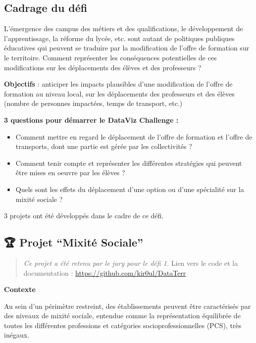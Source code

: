 \documentclass[]{book}
\begin{document}
\subsection{Cadrage du défi}\label{cadrage-du-defi}

L'émergence des campus des métiers et des qualifications, le
développement de l'apprentissage, la réforme du lycée, etc. sont autant
de politiques publiques éducatives qui peuvent se traduire par la
modification de l'offre de formation sur le territoire. Comment
représenter les conséquences potentielles de ces modifications sur les
déplacements des élèves et des professeurs ?

\textbf{Objectifs} : anticiper les impacts plausibles d'une modification
de l'offre de formation au niveau local, sur les déplacements des
professeurs et des élèves (nombre de personnes impactées, temps de
transport, etc.)

\textbf{3 questions pour démarrer le DataViz Challenge :}

\begin{itemize}
\item
  Comment mettre en regard le déplacement de l'offre de formation et
  l'offre de transports, dont une partie est gérée par les collectivités
  ?
\item
  Comment tenir compte et représenter les différentes stratégies qui
  peuvent être mises en oeuvre par les élèves ?
\item
  Quels sont les effets du déplacement d'une option ou d'une spécialité
  sur la mixité sociale ?
\end{itemize}

3 projets ont été développés dans le cadre de ce défi.

\subsection{\texorpdfstring{🏆 Projet ``Mixité
Sociale''}{🏆 Projet Mixité Sociale}}\label{projet-mixite-sociale}

\begin{quote}
\emph{Ce projet a été retenu par le jury pour le défi 1.} Lien vers le
code et la documentation : \url{https://github.com/kir0ul/DataTerr}
\end{quote}

\textbf{Contexte}

Au sein d'un périmètre restreint, des établissements peuvent être
caractérisés par des niveaux de mixité sociale, entendue comme la
représentation équilibrée de toutes les différentes professions et
catégories socioprofessionnelles (PCS), très inégaux.
\end{document}
